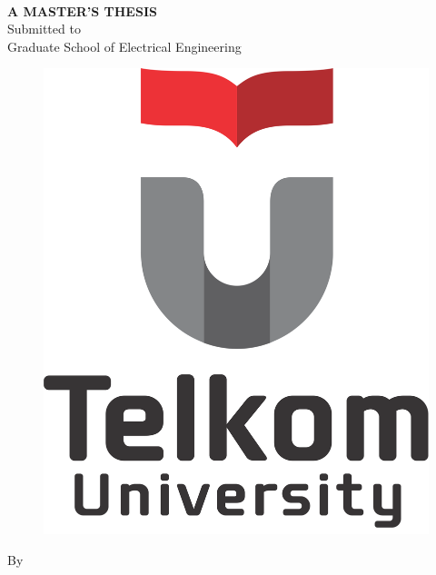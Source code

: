 \begin{titlepage}
    \begin{center}      
    	\vspace*{0.15cm}
        \bo{\large\Judul} \\[0.5cm]
        \vspace*{0cm}    
        \textbf{A MASTER'S THESIS}\\
        \vspace*{0.5cm}
		Submitted to\\
		Graduate School of Electrical Engineering
        \vspace*{1.5cm}
                      
        \begin{figure}
            \begin{center}
                \includegraphics[scale=0.35]{logo/logo_telu1}
            \end{center}
        \end{figure}
        \vspace*{0.75cm}
        By\\
        \vspace*{0.25cm}
        \bo{\Penulis} \\
        \vspace*{0.25cm}
        \bo{\nim} \\
        

\end{center}
\end{titlepage}
